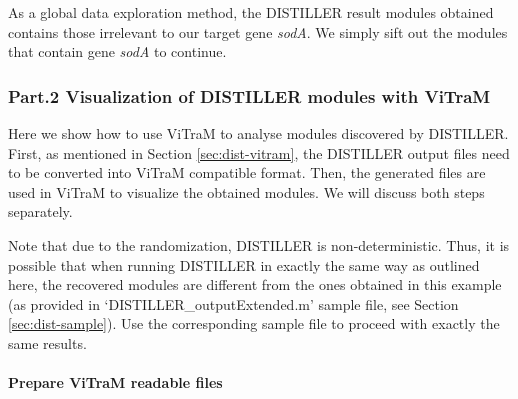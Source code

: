 
As a global data exploration method, the DISTILLER result modules obtained 
contains those irrelevant to our target gene \textit{sodA}. 
We simply sift out the modules that contain gene \textit{sodA} to continue.






\subsubsection{Part.2 Visualization of DISTILLER modules with ViTraM}
Here we show how to use ViTraM to analyse modules discovered by DISTILLER. 
First, as mentioned in Section \ref{sec:dist-vitram}, the DISTILLER output files
need to be converted into ViTraM compatible format. 
Then, the generated files are used in ViTraM to visualize the obtained modules. 
We will discuss both steps separately.

Note that due to the randomization, DISTILLER is non-deterministic. Thus, it is 
possible that when running DISTILLER in exactly the same way as outlined here, 
the recovered modules are different from the ones obtained in this example (as 
provided in `DISTILLER\_outputExtended.m' sample file, see Section 
\ref{sec:dist-sample}). 
Use the corresponding sample file to proceed with exactly the same 
results.


\paragraph{Prepare ViTraM readable files}

